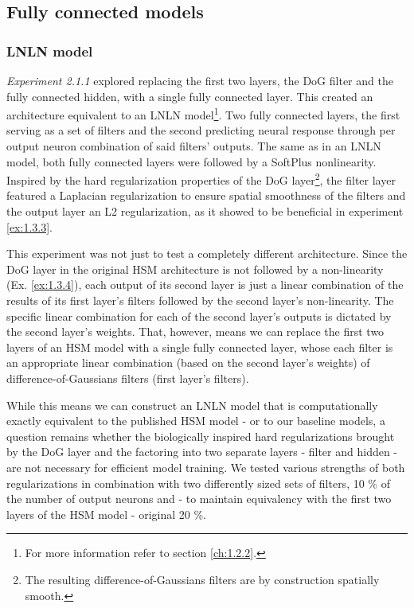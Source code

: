 \subsection{Fully connected models}
\subsubsection{LNLN model}\label{ex:2.1.1}

\textit{Experiment 2.1.1} explored replacing the first two layers, the DoG filter and the fully connected hidden, with a single fully connected layer. This created an architecture equivalent to an LNLN model\footnote{For more information refer to section \ref{ch:1.2.2}.}. Two fully connected layers, the first serving as a set of filters and the second predicting neural response through per output neuron combination of said filters’ outputs. The same as in an LNLN model, both fully connected layers were followed by a SoftPlus nonlinearity. Inspired by the hard regularization properties of the DoG layer\footnote{The resulting difference-of-Gaussians filters are by construction spatially smooth.}, the filter layer featured a Laplacian regularization to ensure spatial smoothness of the filters and the output layer an L2 regularization, as it showed to be beneficial in experiment \ref{ex:1.3.3}.

This experiment was not just to test a completely different architecture. Since the DoG layer in the original HSM architecture is not followed by a non-linearity (Ex. \ref{ex:1.3.4}), each output of its second layer is just a linear combination of the results of its first layer’s filters followed by the second layer’s non-linearity. The specific linear combination for each of the second layer’s outputs is dictated by the second layer’s weights. That, however, means we can replace the first two layers of an HSM model with a single fully connected layer, whose each filter is an appropriate linear combination (based on the second layer’s weights) of difference-of-Gaussians filters (first layer’s filters). 

While this means we can construct an LNLN model that is computationally exactly equivalent to the published HSM model - or to our baseline models, a question remains whether the biologically inspired hard regularizations brought by the DoG layer and the factoring into two separate layers - filter and hidden - are not necessary for efficient model training. We tested various strengths of both regularizations in combination with two differently sized sets of filters, 10 \% of the number of output neurons and - to maintain equivalency with the first two layers of the HSM model - original 20 \%.

